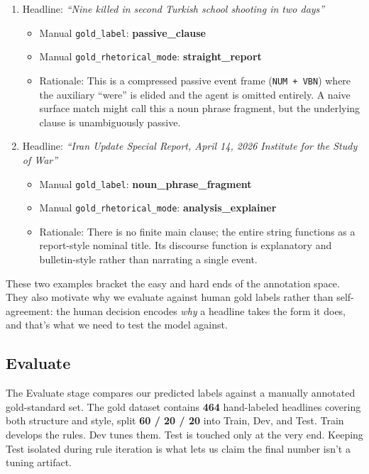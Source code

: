 \documentclass[11pt]{article}
\begin{document}
\begin{enumerate}
    \item Headline: \emph{``Nine killed in second Turkish school shooting in two days''}
    \begin{itemize}
        \item Manual \texttt{gold\_label}: \textbf{passive\_clause}
        \item Manual \texttt{gold\_rhetorical\_mode}: \textbf{straight\_report}
        \item Rationale: This is a compressed passive event frame (\texttt{NUM + VBN}) where the auxiliary ``were'' is elided and the agent is omitted entirely. A naive surface match might call this a noun phrase fragment, but the underlying clause is unambiguously passive.
    \end{itemize}
    \item Headline: \emph{``Iran Update Special Report, April 14, 2026 Institute for the Study of War''}
    \begin{itemize}
        \item Manual \texttt{gold\_label}: \textbf{noun\_phrase\_fragment}
        \item Manual \texttt{gold\_rhetorical\_mode}: \textbf{analysis\_explainer}
        \item Rationale: There is no finite main clause; the entire string functions as a report-style nominal title. Its discourse function is explanatory and bulletin-style rather than narrating a single event.
    \end{itemize}
\end{enumerate}

These two examples bracket the easy and hard ends of the annotation space. They also motivate why we evaluate against human gold labels rather than self-agreement: the human decision encodes \emph{why} a headline takes the form it does, and that's what we need to test the model against.

\subsection{Evaluate}
The Evaluate stage compares our predicted labels against a manually annotated gold-standard set. The gold dataset contains \textbf{464} hand-labeled headlines covering both structure and style, split \textbf{60 / 20 / 20} into Train, Dev, and Test. Train develops the rules. Dev tunes them. Test is touched only at the very end. Keeping Test isolated during rule iteration is what lets us claim the final number isn't a tuning artifact.
\end{document}
